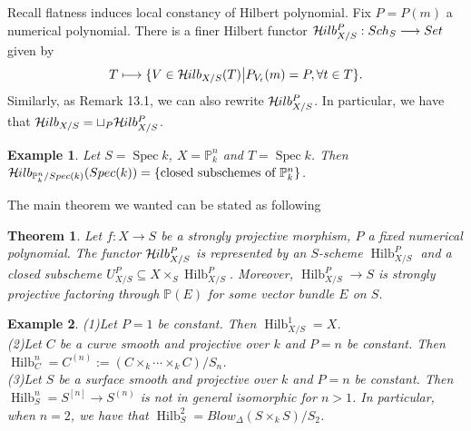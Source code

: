 \documentclass{ctexart}
\newtheorem{theorem}{Theorem}[section]
\newtheorem{example}{Example}[section]
\newcommand{\spec}{\operatorname{Spec}}
\newcommand{\hilbertscheme}{\operatorname{Hilb}}
\newcommand{\hilbertfunctor}{\mathcal{H}\kern -.5pt ilb}
\begin{document}
Recall flatness induces local constancy of Hilbert polynomial.
Fix $P = P(m)$ a numerical polynomial.
There is a finer Hilbert functor $\hilbertfunctor_{X/S}^{P}: Sch_{S} \longrightarrow Set$ given by 
\begin{equation*}
    T \longmapsto \{V\in \hilbertfunctor_{X/S}(T) \big{|} P_{V_{t}}(m) = P, \forall t\in T\}.
\end{equation*}
Similarly, as Remark 13.1, we can also rewrite $\hilbertfunctor_{X/S}^{P}$.
In particular, we have that $\hilbertfunctor_{X/S} = \sqcup_{P} \hilbertfunctor_{X/S}^{P}$.
\begin{example}
    Let $S = \spec k$, $X = \mathbb{P}_{k}^{n}$ and $T = \spec k$.
    Then $\hilbertfunctor_{\mathbb{P}_{k}^{n}/Spec(k)}(Spec(k)) = \{\text{closed subschemes of }\mathbb{P}_{k}^{n}\}$.
\end{example}
The main theorem we wanted can be stated as following
\begin{theorem}
    Let $f: X \longrightarrow S$ be a strongly projective morphism, $P$ a fixed numerical polynomial.
    The functor $\hilbertfunctor_{X/S}^{P}$ is represented by an $S$-scheme $\hilbertscheme_{X/S}^{P}$ and a closed subscheme $U_{X/S}^{P} \subseteq X \times_{S} \hilbertscheme_{X/S}^{P}$.
    Moreover, $\hilbertscheme_{X/S}^{P} \longrightarrow S$ is strongly projective factoring through $\mathbb{P}(E)$ for some vector bundle $E$ on $S$.
    \label{Theorem 13.1}
\end{theorem}
\begin{example}
    (1)Let $P = 1$ be constant.
    Then $\hilbertscheme_{X/S}^{1} = X$. \\
    (2)Let $C$ be a curve smooth and projective over $k$ and $P = n$ be constant.
    Then $\hilbertscheme_{C}^{n} = C^{(n)} := (C \times_{k} \cdots \times_{k} C)/S_{n}$. \\
    (3)Let $S$ be a surface smooth and projective over $k$ and $P = n$ be constant.
    Then $\hilbertscheme_{S}^{n} = S^{[n]} \longrightarrow S^{(n)}$ is not in general isomorphic for $n > 1$.
    In particular, when $n = 2$, we have that $\hilbertscheme_{S}^{2} = Blow_{\Delta}(S \times_{k} S)/S_{2}$.
\end{example}
\end{document}
